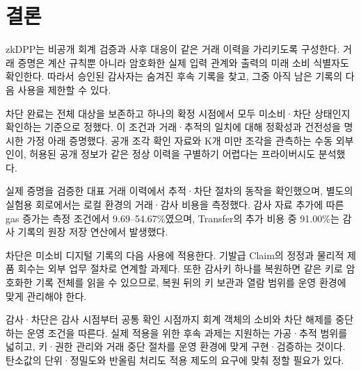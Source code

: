 \section{결론}
\label{sec:conclusion}

zkDPP는 비공개 회계 검증과 사후 대응이 같은 거래 이력을 가리키도록
구성한다. 거래 증명은 계산 규칙뿐 아니라 암호화한 실제 입력 관계와
출력의 미래 소비 식별자도 확인한다. 따라서 승인된 감사자는 숨겨진
후속 기록을 찾고, 그중 아직 남은 기록의 다음 사용을 제한할 수 있다.

차단 완료는 전체 대상을 보존하고 하나의 확정 시점에서 모두
미소비·차단 상태인지 확인하는 기준으로 정했다.
이 조건과 거래·추적의 일치에 대해 정확성과 건전성을
명시한 가정 아래 증명했다. 공개 조각 확인 자료와 K개 미만 조각을
관측하는 수동 외부인이, 허용된 공개 정보가 같은 정상 이력을
구별하기 어렵다는 프라이버시도 분석했다.

실제 증명을 검증한 대표 거래 이력에서 추적·차단 절차의
동작을 확인했으며, 별도의 실험용
회로에서는 로컬 환경의 거래·감사 비용을 측정했다.
감사 자료 추가에 따른 gas 증가는 측정 조건에서
9.69--54.67\%였으며, Transfer의 추가 비용 중 91.00\%는
감사 기록의 원장 저장 연산에서 발생했다.

차단은 미소비 디지털 기록의 다음 사용에 적용한다.
기발급 Claim의 정정과 물리적 제품 회수는 외부 업무 절차로 연계할 과제다.
또한 감사키 하나를 복원하면 같은 키로 암호화한 기록 전체를 읽을 수 있으므로,
복원 뒤의 키 보관과 열람 범위를 운영 환경에 맞게 관리해야 한다.

감사·차단은 감사 시점부터 공통 확인 시점까지 회계 객체의 소비와
차단 해제를 중단하는 운영 조건을 따른다. 실제 적용을 위한 후속
과제는 지원하는 가공·추적 범위를 넓히고, 키·권한 관리와 거래 중단
절차를 운영 환경에 맞게 구현·검증하는 것이다. 탄소값의 단위·정밀도와
반올림 처리도 적용 제도의 요구에 맞춰 정할 필요가 있다.
